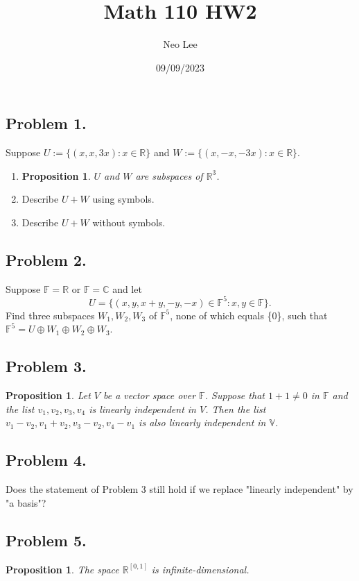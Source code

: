 \documentclass{article}
\title{Math 110 HW2}
\author{Neo Lee}
\date{09/09/2023}
\newtheorem{proposition}[thm]{Proposition}
\begin{document}
 

\maketitle 

\subsection*{Problem 1.}
Suppose $U:=\{(x,x,3x):x\in\mathbb{R}\}$ and $W:=\{(x,-x,-3x):x\in\mathbb{R}\}$. 
\begin{enumerate}[label=(\alph*)]
    \item \begin{proposition}
        $U$ and $W$ are subspaces of $\mathbb{R}^3$.
    \end{proposition}
    \item Describe $U+W$ using symbols.
    \item Describe $U+ W$ without symbols.
\end{enumerate}

\subsection*{Problem 2.}
Suppose $\mathbb{F}=\mathbb{R}$ or $\mathbb{F} = \mathbb{C}$ and let 
$$U = \{(x,y,x+y,-y,-x)\in\mathbb{F}^5:x,y\in\mathbb{F}\}.$$
Find three subspaces $W_1, W_2, W_3$ of $\mathbb{F}^5$, none of which equals \{0\}, such that 
$\mathbb{F}^5=U\oplus W_1\oplus W_2\oplus W_3$.

\subsection*{Problem 3.}
\begin{proposition}
    Let $V$ be a vector space over $\mathbb{F}$. Suppose that $1+1\neq 0$ in $\mathbb{F}$ and the 
    list $v_1,v_2,v_3,v_4$ is linearly independent in $V$. Then the list $v_1-v_2,v_1+v_2,v_3-v_2
    ,v_4-v_1$ is also linearly independent in $\mathbb{V}$.
\end{proposition}

\subsection*{Problem 4.}
Does the statement of Problem 3 still hold if we replace "linearly independent" by "a basis"?

\subsection*{Problem 5.}
\begin{proposition}
    The space $\mathbb{R}^{[0,1]}$ is infinite-dimensional.
\end{proposition}
\end{document}
